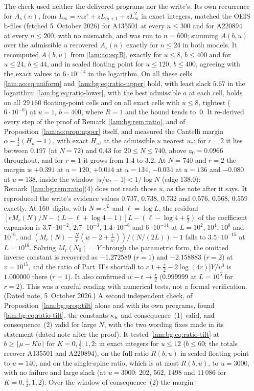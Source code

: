 \documentclass[11pt,a4paper]{article}
\numberwithin{equation}{section}
\theoremstyle{remark}
\begin{document}
The check used neither the delivered programs nor the write's. Its own recurrence for $A_s(n)$, from $L_m=mz^s+zL_{m+1}+zL_m^2$ in exact integers, matched the OEIS b-files (fetched 5~October 2026) for A135501 at every $n\le300$ and for A220894 at every $n\le200$, with no mismatch, and was run to $n=600$; summing $A(b,u)$ over the admissible $u$ recovered $A_s(n)$ exactly for $n\le24$ in both models. It recomputed $A(b,u)$ from \eqref{lam:ao:eq:B}, exactly for $u\le8$, $b\le400$ and for $u\le24$, $b\le44$, and in scaled floating point for $u\le120$, $b\le400$, agreeing with the exact values to $6\cdot10^{-14}$ in the logarithm. On all these cells \eqref{lam:ao:eq:uniform} and \eqref{lam:bg:eq:ratio-upper} hold, with least slack $5.67$ in the logarithm; \eqref{lam:bg:eq:ratio-lower}, with the best admissible $a$ at each cell, holds on all $29\,160$ floating-point cells and on all exact cells with $u\le8$, tightest ($6\cdot10^{-6}$) at $u=1$, $b=400$, where $R=1$ and the bound tends to~$0$. It re-derived every step of the proof of Remark~\ref{lam:bg:rem:ratio}, and of Proposition~\ref{lam:ao:prop:upper} itself, and measured the Cantelli margin $\alpha-\frac12(H_u-1)$, with exact $H_u$, at the admissible $u$ nearest $u_*$: for $r=2$ it lies between $0.197$ (at $N=72$) and $0.43$ for $20\le N\le740$, above $a_0=0.0966$ throughout, and for $r=1$ it grows from $1.4$ to $3.2$. At $N=740$ and $r=2$ the margin is $+0.391$ at $u=120$, $+0.014$ at $u=134$, $-0.034$ at $u=136$ and $-0.080$ at $u=138$, inside the window $|u/u_*-1|<1/\log N$ (edge $138.0$): Remark~\ref{lam:bg:rem:ratio}(4) does not reach those $u$, as the note after it says. It reproduced the write's evidence values $0.737$, $0.738$, $0.732$ and $0.576$, $0.568$, $0.559$ exactly. At 160~digits, with $N=e^L$ and $\ell=\log L$, the residual $[rM_r(N)/N-(L-\ell+\log4-1)]L-(\ell-\log4+\frac r2)$ of the coefficient expansion is $3.7\cdot10^{-2}$, $2.7\cdot10^{-3}$, $1.4\cdot10^{-6}$ and $6\cdot10^{-14}$ at $L=10^2$, $10^4$, $10^8$ and $10^{16}$, and $(M_r(N)-\frac Nr(w-2+\frac1w))/(N/(2L))-1$ falls to $3.5\cdot10^{-15}$ at $L=10^{16}$. Solving $M_r(N_0)=Y$ through the parametric form, the omitted inverse constant is recovered as $-1.272589$ ($r=1$) and $-2.158883$ ($r=2$) at $v=10^{15}$, and the ratio of Part~II's shortfall to $r|1+\frac r2-2\log(4r)|Y/v^3$ is $1.000000$ there ($r=1$). It also confirmed $w-t\to\frac r2$ ($0.999999$ at $L=10^6$ for $r=2$). This was a careful reading with numerical tests, not a formal verification. (Dated note, 5~October 2026.) A second independent check, of Proposition~\ref{lam:bg:prop:tilt} alone and with its own programs, found \eqref{lam:bg:eq:ratio-tilt}, the constants $\kappa_K$ and consequence~(1) valid, and consequence~(2) valid for large $N$, with the two wording fixes made in its statement (dated note after the proof). It tested \eqref{lam:bg:eq:ratio-tilt} at $b\ge\lceil\mu-Ku\rceil$ for $K=0,\frac12,1,2$: in exact integers for $u\le12$ ($b\le60$; the totals recover A135501 and A220894), on the full ratio $R(b,u)$ in scaled floating point to $u=140$, and on the single-spine ratio, which is at most $R(b,u)$, to $u=3000$, with no failure and large slack (at $u=3000$: $202$, $562$, $1498$ and $11\,086$ for $K=0,\frac12,1,2$). Over the window of consequence~(2) the margin 
\end{document}
